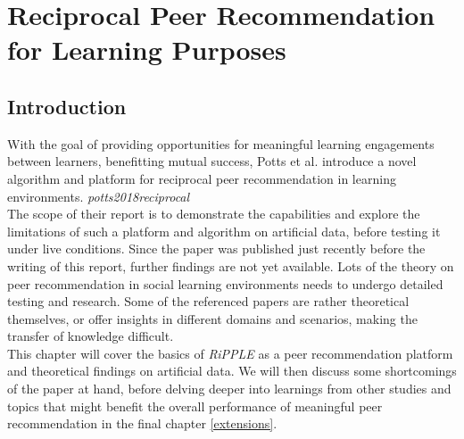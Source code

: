 \documentclass[nochapterpage,bigchapter,linedtoc,longdoc,colorback,accentcolor=tud3b,oneside]{tudreport}
\begin{document}
\chapter{Reciprocal Peer Recommendation for Learning Purposes} \label{paper}
\section{Introduction} \label{paper:introduction}
With the goal of providing opportunities for meaningful learning engagements between learners, benefitting mutual success, Potts et al. introduce a novel algorithm and platform for reciprocal peer recommendation in learning environments. \textit{potts2018reciprocal}\\
The scope of their report is to demonstrate the capabilities and explore the limitations of such a platform and algorithm on artificial data, before testing it under live conditions. Since the paper was published just recently before the writing of this report, further findings are not yet available. Lots of the theory on peer recommendation in social learning environments needs to undergo detailed testing and research. Some of the referenced papers are rather theoretical themselves, or offer insights in different domains and scenarios, making the transfer of knowledge difficult.\\
This chapter will cover the basics of \textit{RiPPLE} as a peer recommendation platform and theoretical findings on artificial data. We will then discuss some shortcomings of the paper at hand, before delving deeper into learnings from other studies and topics that might benefit the overall performance of meaningful peer recommendation in the final chapter \ref{extensions}.\\
\end{document}
